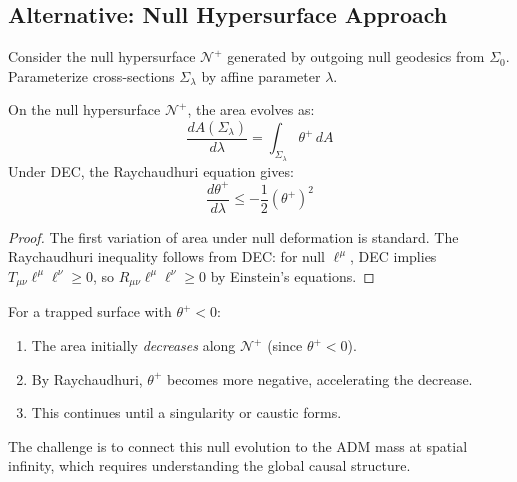 \subsection{Alternative: Null Hypersurface Approach}

\begin{definition}\label{def:NullExpansionFlow}
Consider the null hypersurface $\mathcal{N}^+$ generated by outgoing null geodesics from $\Sigma_0$. Parameterize cross-sections $\Sigma_\lambda$ by affine parameter $\lambda$.
\end{definition}

\begin{proposition}\label{prop:NullAreaEvolution}
On the null hypersurface $\mathcal{N}^+$, the area evolves as:
\begin{equation}
    \frac{d A(\Sigma_\lambda)}{d\lambda} = \int_{\Sigma_\lambda} \theta^+ \, dA
\end{equation}
Under DEC, the Raychaudhuri equation gives:
\begin{equation}
    \frac{d\theta^+}{d\lambda} \leq -\frac{1}{2}(\theta^+)^2
\end{equation}
\end{proposition}

\begin{proof}
The first variation of area under null deformation is standard. The Raychaudhuri inequality follows from DEC: for null $\ell^\mu$, DEC implies $T_{\mu\nu}\ell^\mu \ell^\nu \geq 0$, so $R_{\mu\nu}\ell^\mu \ell^\nu \geq 0$ by Einstein's equations.
\end{proof}

\begin{remark}
For a trapped surface with $\theta^+ < 0$:
\begin{enumerate}
    \item The area initially \emph{decreases} along $\mathcal{N}^+$ (since $\theta^+ < 0$).
    \item By Raychaudhuri, $\theta^+$ becomes more negative, accelerating the decrease.
    \item This continues until a singularity or caustic forms.
\end{enumerate}
The challenge is to connect this null evolution to the ADM mass at spatial infinity, which requires understanding the global causal structure.
\end{remark}

